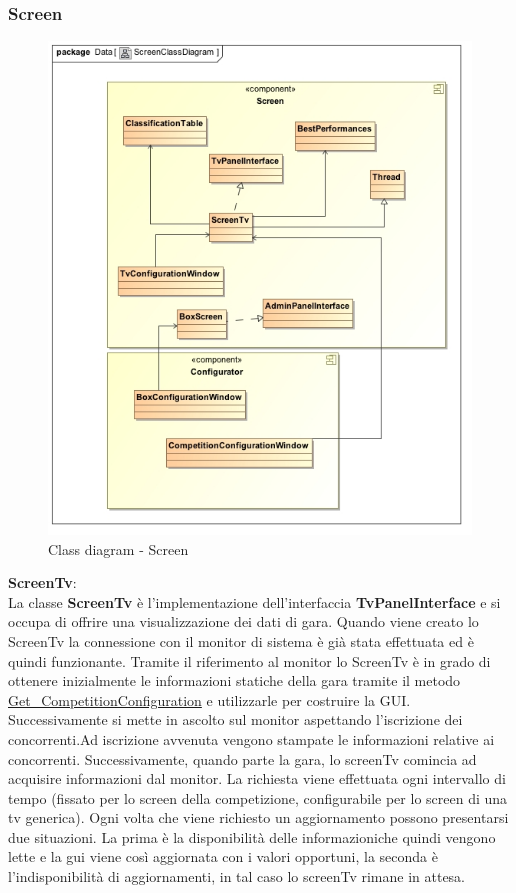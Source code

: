 \subsubsection{Screen}
\begin{center}
\begin{figure}[h!]
	\includegraphics[scale=0.50]{img/ClassDiagrams/ScreenClassDiagram.jpg}
\caption{Class diagram - Screen}
\end{figure}
\begin{description}
\item{\textbf{ScreenTv}}:\\
La classe \textbf{ScreenTv} \`{e} l'implementazione dell'interfaccia \textbf{TvPanelInterface} e si occupa di offrire una visualizzazione dei dati di gara.
Quando viene creato lo ScreenTv la connessione con il monitor di sistema \`{e} gi\`{a} stata effettuata ed \`{e} quindi funzionante. Tramite il riferimento al monitor lo ScreenTv \`{e} in grado di ottenere inizialmente le informazioni statiche della gara tramite il metodo \underline{Get\_CompetitionConfiguration} e utilizzarle per costruire la GUI. Successivamente si mette in ascolto sul monitor aspettando l'iscrizione dei concorrenti.Ad iscrizione avvenuta vengono stampate le informazioni relative ai concorrenti. Successivamente, quando parte la gara, lo screenTv comincia ad acquisire informazioni dal monitor. La richiesta viene effettuata ogni intervallo di tempo (fissato per lo screen della competizione, configurabile per lo screen di una tv generica). Ogni volta che viene richiesto un aggiornamento possono presentarsi due situazioni. La prima \`{e} la disponibilit\`{a} delle informazioniche quindi vengono lette e la gui viene cos\`{i} aggiornata con i valori opportuni, la seconda \`{e} l'indisponibilit\`{a} di aggiornamenti, in tal caso lo screenTv rimane in attesa.
\end{description}
\end{center}
